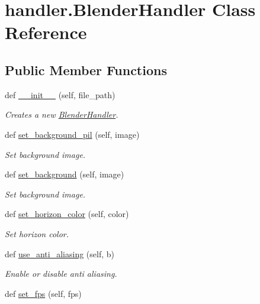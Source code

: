 \hypertarget{classhandler_1_1BlenderHandler}{}\section{handler.\+Blender\+Handler Class Reference}
\label{classhandler_1_1BlenderHandler}
\subsection*{Public Member Functions}
\begin{DoxyCompactItemize}
\item 
def \hyperlink{classhandler_1_1BlenderHandler_ab8b8c05e8cacd4deed51f02218ba75de}{\+\_\+\+\_\+init\+\_\+\+\_\+} (self, file\+\_\+path)
\begin{DoxyCompactList}\small\item\em Creates a new \hyperlink{classhandler_1_1BlenderHandler}{Blender\+Handler}. \end{DoxyCompactList}\item 
def \hyperlink{classhandler_1_1BlenderHandler_acf6429fb35078f4fb59510a46d5c80d1}{set\+\_\+background\+\_\+pil} (self, image)
\begin{DoxyCompactList}\small\item\em Set background image. \end{DoxyCompactList}\item 
def \hyperlink{classhandler_1_1BlenderHandler_a78adf542e7b1b6ffe009d680c01b2270}{set\+\_\+background} (self, image)
\begin{DoxyCompactList}\small\item\em Set background image. \end{DoxyCompactList}\item 
def \hyperlink{classhandler_1_1BlenderHandler_ae700e5cdd64c7efc38fd704c382de27d}{set\+\_\+horizon\+\_\+color} (self, color)
\begin{DoxyCompactList}\small\item\em Set horizon color. \end{DoxyCompactList}\item 
def \hyperlink{classhandler_1_1BlenderHandler_a73b1060e394c8f36355e7bdcf126eb6e}{use\+\_\+anti\+\_\+aliasing} (self, b)
\begin{DoxyCompactList}\small\item\em Enable or disable anti aliasing. \end{DoxyCompactList}\item 
def \hyperlink{classhandler_1_1BlenderHandler_aa4978ad675a1c206fddae198ef445d60}{set\+\_\+fps} (self, fps)

\end{DoxyCompactItemize}

